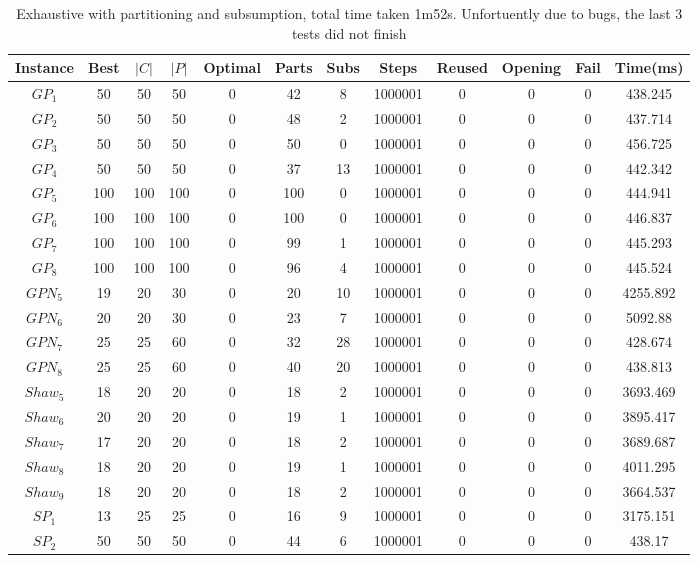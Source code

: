 \begin{table}[H]
\begin{tabular}{|c|c|c|c|c|c|c|c|c|c|c|c|} \hline
Instance&Best&$|C|$&$|P|$&Optimal&Parts&Subs&Steps&Reused&Opening&Fail&Time(ms) \\\hline
$GP_1$&50&50&50&0&42 &8&1000001&0&0&0&438.245\\ 
$GP_2$&50&50&50&0&48 &2&1000001&0&0&0&437.714\\ 
$GP_3$&50&50&50&0&50 &0&1000001&0&0&0&456.725\\ 
$GP_4$&50&50&50&0&37 &13&1000001&0&0&0&442.342\\ 
$GP_5$&100&100&100&0&100 &0&1000001&0&0&0&444.941\\ 
$GP_6$&100&100&100&0&100 &0&1000001&0&0&0&446.837\\ 
$GP_7$&100&100&100&0&99 &1&1000001&0&0&0&445.293\\ 
$GP_8$&100&100&100&0&96 &4&1000001&0&0&0&445.524\\ 
$GPN_5$&19&20&30&0&20 &10&1000001&0&0&0&4255.892\\ 
$GPN_6$&20&20&30&0&23 &7&1000001&0&0&0&5092.88\\ 
$GPN_7$&25&25&60&0&32 &28&1000001&0&0&0&428.674\\ 
$GPN_8$&25&25&60&0&40 &20&1000001&0&0&0&438.813\\ 
$Shaw_5$&18&20&20&0&18 &2&1000001&0&0&0&3693.469\\ 
$Shaw_6$&20&20&20&0&19 &1&1000001&0&0&0&3895.417\\ 
$Shaw_7$&17&20&20&0&18 &2&1000001&0&0&0&3689.687\\ 
$Shaw_8$&18&20&20&0&19 &1&1000001&0&0&0&4011.295\\ 
$Shaw_9$&18&20&20&0&18 &2&1000001&0&0&0&3664.537\\ 
$SP_1$&13&25&25&0&16 &9&1000001&0&0&0&3175.151\\ 
$SP_2$&50&50&50&0&44 &6&1000001&0&0&0&438.17\\ 
\hline
\end{tabular}
\caption{ Exhaustive with partitioning and subsumption, total time taken 1m52s. Unfortuently due to bugs, the last 3 tests did not finish }
\end{table}


